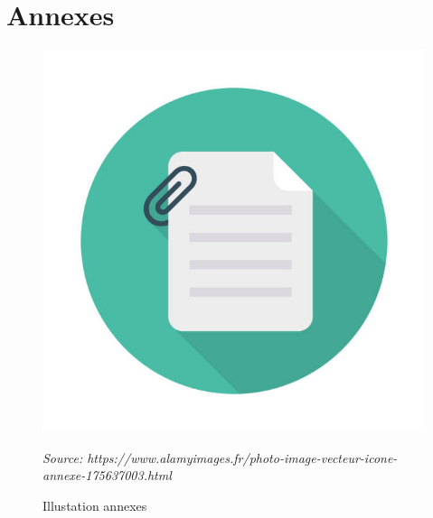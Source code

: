 \documentclass[12pt,a4paper,twoside]{article}
\newcommand{\source}[1]{\vspace{-11pt} \caption*{\small \textit{Source: {#1}} }}
\begin{document}
\clearpage
\section{Annexes}

\begin{figure}[h]
	\centering
	\includegraphics[width=0.7\linewidth]{Figures/Annexes}
	\caption{Illustation annexes}
	\label{fig:annexes}
	\source{https://www.alamyimages.fr/photo-image-vecteur-icone-annexe-175637003.html}
\end{figure}






\end{document}
